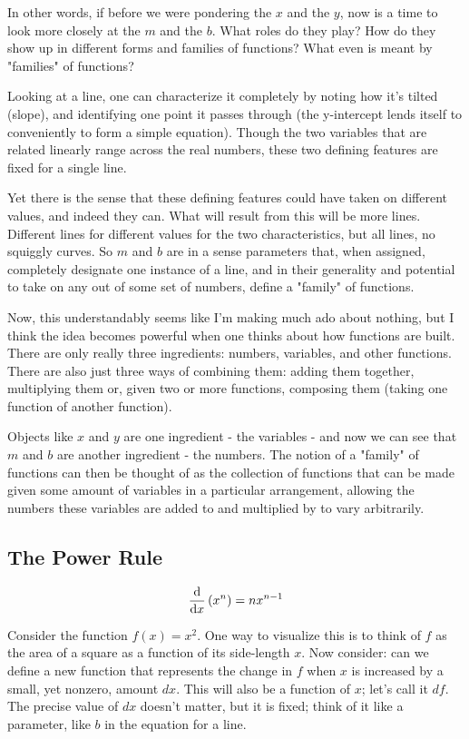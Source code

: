 \documentclass[a4paper]{article}
\begin{document}
In other words, if before we were pondering the $x$ and the $y$, now is a time to look more closely at the $m$ and the $b$. What roles do they play? How do they show up in different forms and families of functions? What even is meant by "families" of functions?

Looking at a line, one can characterize it completely by noting how it's tilted (slope), and identifying one point it passes through (the y-intercept lends itself to conveniently to form a simple equation). Though the two variables that are related linearly range across the real numbers, these two defining features are fixed for a single line.

Yet there is the sense that these defining features could have taken on different values, and indeed they can. What will result from this will be more lines. Different lines for different values for the two characteristics, but all lines, no squiggly curves. So $m$ and $b$ are in a sense parameters that, when assigned, completely designate one instance of a line, and in their generality and potential to take on any out of some set of numbers, define a "family" of functions.

Now, this understandably seems like I'm making much ado about nothing, but I think the idea becomes powerful when one thinks about how functions are built. There are only really three ingredients: numbers, variables, and other functions. There are also just three ways of combining them: adding them together, multiplying them or, given two or more functions, composing them (taking one function of another function). 

Objects like $x$ and $y$ are one ingredient - the variables - and now we can see that $m$ and $b$ are another ingredient - the numbers. The notion of a "family" of functions can then be thought of as the collection of functions that can be made given some amount of variables in a particular arrangement, allowing the numbers these variables are added to and multiplied by to vary arbitrarily.

\subsection{The Power Rule}

$$ \dv{}{x}\left(x^n\right)  = nx^{n-1} $$

Consider the function $f(x)=x^2$. One way to visualize this is to think of $f$ as the area of a square as a function of its side-length $x$. Now consider: can we define a new function that represents the change in $f$ when $x$ is increased by a small, yet nonzero, amount $dx$. This will also be a function of $x$; let's call it $df$. The precise value of $dx$ doesn't matter, but it is fixed; think of it like a parameter, like $b$ in the equation for a line.
\end{document}

